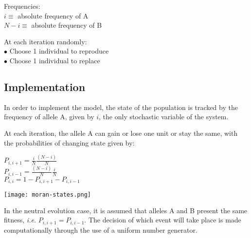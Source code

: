 \documentclass[12pt]{article}
\newcommand{\blank}[1]{\hspace*{#1}}
\begin{document}
\begin{minipage}{.5\textwidth}
    \indent Frequencies:\\
    \blank{0.5cm} $i \equiv$ absolute frequency of A\\
    \blank{0.5cm} $N - i \equiv$ absolute frequency of B
\end{minipage}
\begin{minipage}{.5\textwidth}
    At each iteration randomly:\\
    \blank{0.5cm} $\bullet$ Choose 1 individual to reproduce\\
    \blank{0.5cm} $\bullet$ Choose 1 individual to replace
\end{minipage}


\subsection{Implementation}

\indent In order to implement the model, the state of the population is tracked by the frequency of allele A, given by $i$, the only stochastic variable of the system. 

\begin{center}
    \begin{minipage}{.5\textwidth}
    \blank{0.5cm} At each iteration, the allele A can gain or lose one unit or stay the same, with the probabilities of changing state given by:
    \begin{center}
        \indent\indent $P_{i, i + 1} = \frac{i}{N}\frac{(N - i)}{N}$\\
        \vspace{2mm}
        \indent\indent $P_{i, i - 1} = \frac{(N - i)}{N}\frac{i}{N}$\\
        \vspace{2mm}
        \indent\indent $P_{i, i} = 1 - P_{i, i + 1} - P_{i, i - 1}$
    \end{center}
    \end{minipage}%
    \begin{minipage}{.5\textwidth}
        \centering
        \texttt{[image: moran-states.png]}
        \label{fig:my_label}
    \end{minipage}
\end{center}

\indent In the neutral evolution case, it is assumed that alleles A and B present the same fitness, \textit{i.e.} $P_{i, i + 1} = P_{i, i - 1}$. The decision of which event will take place is made computationally through the use of a uniform number generator.
\end{document}
